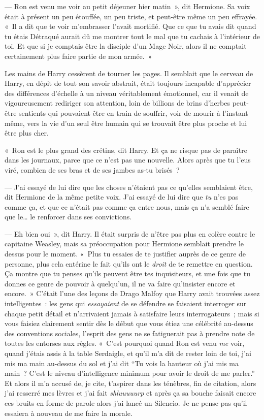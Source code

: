 --- Ron est venu me voir au petit déjeuner hier matin~», dit Hermione.
Sa voix était à présent un peu étouffée, un peu triste, et peut-être même un peu effrayée.
«~Il a dit que te voir m'embrasser l'avait mortifié.
Que ce que tu avais dit quand tu étais Détraqué aurait dû me montrer tout le mal que tu cachais à l'intérieur de toi.
Et que si je comptais être la disciple d'un Mage Noir, alors il ne comptait certainement plus faire partie de mon armée.~»

Les mains de Harry cessèrent de tourner les pages.
Il semblait que le cerveau de Harry, en dépit de tout son savoir abstrait, était toujours incapable d'apprécier des différences d'échelle à un niveau véritablement émotionnel, car il venait de vigoureusement rediriger son attention, loin de billions de brins d'herbes peut-être sentients qui pouvaient être en train de souffrir, voir de mourir à l'instant même, vers la vie d'un seul être humain qui se trouvait être plus proche et lui être plus cher.

«~Ron est le plus grand des crétins, dit Harry.
Et ça ne risque pas de paraître dans les journaux, parce que ce n'est pas une nouvelle.
Alors après que tu l'eus viré, combien de ses bras et de ses jambes as-tu brisés~?

--- J'ai essayé de lui dire que les choses n'étaient pas ce qu'elles semblaient être, dit Hermione de la même petite voix.
J'ai essayé de lui dire que \emph{tu} n'es pas comme ça, et que ce n'était pas comme ça entre nous, mais ça n'a semblé faire que le… le renforcer dans ses convictions.

--- Eh bien oui~», dit Harry.
Il était surpris de n'être pas plus en colère contre le capitaine Weasley, mais sa préoccupation pour Hermione semblait prendre le dessus pour le moment.
«~Plus tu essaies de te justifier auprès de ce genre de personne, plus cela entérine le fait qu'ils ont le \emph{droit} de te remettre en question.
Ça montre que tu penses qu'ils peuvent être tes inquisiteurs, et une fois que tu donnes ce genre de pouvoir à quelqu'un, il ne va faire qu'insister encore et encore.~»
C'était l'une des leçons de Drago Malfoy que Harry avait trouvées assez intelligentes~: les gens qui \emph{essayaient} de se défendre se faisaient interroger sur chaque petit détail et n'arrivaient jamais à satisfaire leurs interrogateurs~; mais si vous faisiez clairement sentir dès le début que vous étiez une célébrité au-dessus des conventions sociales, l'esprit des gens ne se fatiguerait pas à prendre note de toutes les entorses aux règles.
«~C'est pourquoi quand Ron est venu \emph{me} voir, quand j'étais assis à la table Serdaigle, et qu'il m'a dit de rester loin de toi, j'ai mis ma main au-dessus du sol et j'ai dit “Tu vois la hauteur où j'ai mis ma main~?
C'est le niveau d'intelligence minimum pour avoir le droit de me parler.” Et alors il m'a accusé de, je cite, t'aspirer dans les ténèbres, fin de citation, alors j'ai resserré mes lèvres et j'ai fait \emph{shluuuuurp} et après ça sa bouche faisait encore ces bruits en forme de parole alors j'ai lancé un Silencio.
Je ne pense pas qu'il essaiera à nouveau de me faire la morale.

